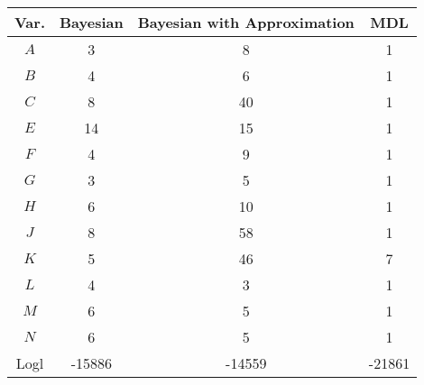 \scriptsize
\begin{tabular}{cccc}
\toprule
Var. & Bayesian & Bayesian with Approximation & MDL    \\
\midrule
$A$    & 3        & 8                           & 1      \\
$B$    & 4        & 6                           & 1      \\
$C$    & 8        & 40                          & 1      \\
$E$    & 14       & 15                          & 1      \\
$F$    & 4        & 9                           & 1      \\
$G$    & 3        & 5                           & 1      \\
$H$    & 6        & 10                          & 1      \\
$J$    & 8        & 58                          & 1      \\
$K$    & 5        & 46                          & 7      \\
$L$    & 4        & 3                           & 1      \\
$M$    & 6        & 5                           & 1      \\
$N$    & 6        & 5                           & 1      \\
\addlinespace[0.5em]
Logl & -15886   & -14559                      & -21861 \\
\bottomrule
\end{tabular}
